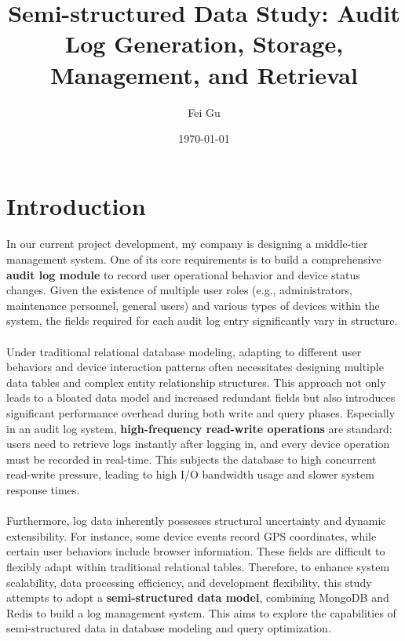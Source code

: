 \documentclass{article}
\title{Semi-structured Data Study: Audit Log Generation, Storage, Management, and Retrieval}
\author{Fei Gu}
\date{\today}
\begin{document}
\maketitle

\section{Introduction}

\paragraph{} In our current project development, my company is designing a middle-tier management system. One of its core requirements is to build a comprehensive \textbf{audit log module} to record user operational behavior and device status changes. Given the existence of multiple user roles (e.g., administrators, maintenance personnel, general users) and various types of devices within the system, the fields required for each audit log entry significantly vary in structure.

\paragraph{} Under traditional relational database modeling, adapting to different user behaviors and device interaction patterns often necessitates designing multiple data tables and complex entity relationship structures. This approach not only leads to a bloated data model and increased redundant fields but also introduces significant performance overhead during both write and query phases. Especially in an audit log system, \textbf{high-frequency read-write operations} are standard: users need to retrieve logs instantly after logging in, and every device operation must be recorded in real-time. This subjects the database to high concurrent read-write pressure, leading to high I/O bandwidth usage and slower system response times.

\paragraph{} Furthermore, log data inherently possesses structural uncertainty and dynamic extensibility. For instance, some device events record GPS coordinates, while certain user behaviors include browser information. These fields are difficult to flexibly adapt within traditional relational tables. Therefore, to enhance system scalability, data processing efficiency, and development flexibility, this study attempts to adopt a \textbf{semi-structured data model}, combining MongoDB and Redis to build a log management system. This aims to explore the capabilities of semi-structured data in database modeling and query optimization.
\end{document}
